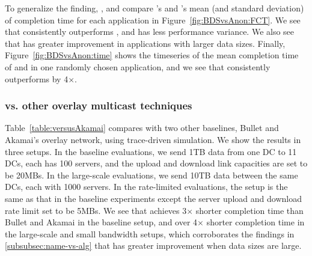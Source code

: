 To generalize the finding, , and compare \name's and \alg's
mean (and standard deviation) of completion time for each application
in Figure~\ref{fig:BDSvsAnon:FCT}.
We see that \name consistently outperforms \alg, and has less
performance variance. We also see that \name has greater improvement
in applications with larger data sizes. 
Finally, Figure~\ref{fig:BDSvsAnon:time} shows the timeseries of the mean
completion time of \name and \alg in one randomly chosen application,
and we see that \name consistently outperforms \alg by 4$\times$.

\subsubsection{\name vs. other overlay multicast techniques}

Table~\ref{table:versusAkamai} compares \name with two other
baselines, Bullet and Akamai's overlay network, using trace-driven
simulation.
We show the results in three setups. In the baseline evaluations,
we send 1TB data from one DC to 11 DCs, each has 100 servers, and
the upload and download link capacities are set to be 20MBs. In the
large-scale evaluations, we send 10TB data between the same DCs, each with
1000 servers. In the rate-limited evaluations, the setup is the same as that in the baseline experiments
except the server upload and download rate limit set to be 5MBs.
We see that \name achieves 3$\times$ shorter completion time than
Bullet and Akamai in the baseline setup, and over 4$\times$ shorter
completion time in the large-scale and small bandwidth setups, which
corroborates the findings in \Section\ref{subsubsec:name-vs-alg} that
\name has greater improvement when data sizes are large.


